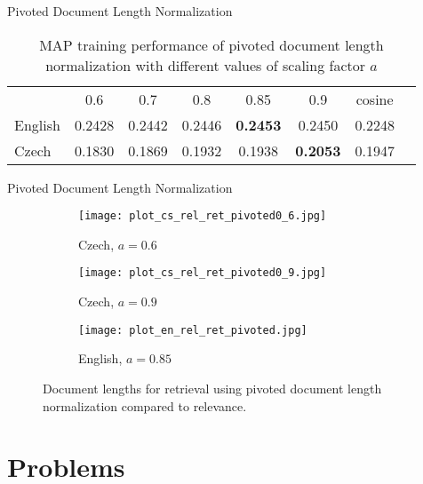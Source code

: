 \documentclass{beamer}
\begin{document}
\begin{frame}{Pivoted Document Length Normalization}

\begin{table}[htpb]
	\centering
	\caption{MAP training performance of pivoted document length normalization 
	with different values of scaling factor $a$\\}
	\label{tab:pivot}
	\begin{tabular}{@{}lccccccc@{}}
		\toprule
		& 0.6 & 0.7 & 0.8 & 0.85 & 0.9 & cosine \\
		\cmidrule(r){1-1}\cmidrule(lr){2-2}\cmidrule(lr){3-3}\cmidrule(lr){4-4}\cmidrule(lr){5-5}\cmidrule(lr){6-6}\cmidrule(l){7-7}
		English & 0.2428 & 0.2442 & 0.2446 & \textbf{0.2453} & 0.2450 & 0.2248 \\
		\cmidrule(r){1-1}\cmidrule(lr){2-2}\cmidrule(lr){3-3}\cmidrule(lr){4-4}\cmidrule(lr){5-5}\cmidrule(lr){6-6}\cmidrule(l){7-7}
		Czech & 0.1830 & 0.1869 & 0.1932 & 0.1938 & \textbf{0.2053} & 0.1947 \\
		\bottomrule
	\end{tabular}
\end{table}

\end{frame}

\begin{frame}{Pivoted Document Length Normalization}

\begin{figure}[htpb]
	\centering
	\begin{subfigure}{0.3\textwidth}
		\texttt{[image: plot\_cs\_rel\_ret\_pivoted0\_6.jpg]}
		\caption{Czech, $a = 0.6$}
		\label{fig:cs_pivot}
	\end{subfigure}
	\hfill
	\begin{subfigure}{0.3\textwidth}
		\texttt{[image: plot\_cs\_rel\_ret\_pivoted0\_9.jpg]}
		\caption{Czech, $a = 0.9$}
		\label{fig:cs_pivot}
	\end{subfigure}
	\hfill
	\begin{subfigure}{0.3\textwidth}
		\texttt{[image: plot\_en\_rel\_ret\_pivoted.jpg]}
		\caption{English, $a = 0.85$}
		\label{fig:en_pivot}
	\end{subfigure}
	\caption{Document lengths for retrieval using pivoted document length
	normalization compared to relevance.}
	\label{fig:pivot}
\end{figure}

\end{frame}

\section{Problems}
\end{document}
